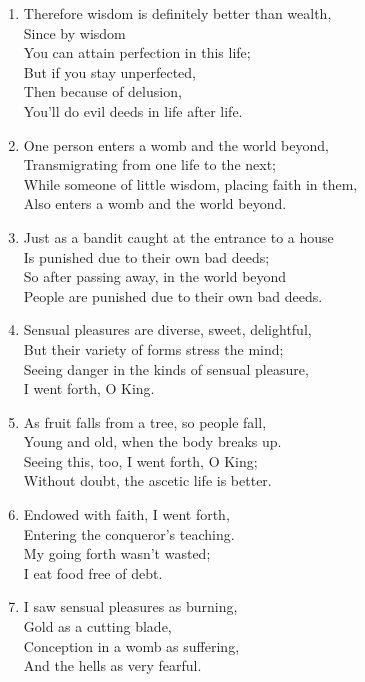 \documentclass[10pt, openany]{book}
\begin{document}
\begin{enumerate}
\item Therefore wisdom is definitely better than wealth,\\
Since by wisdom \\
You can attain perfection in this life;\\
But if you stay unperfected, \\
Then because of delusion,\\
You’ll do evil deeds in life after life.

\item One person enters a womb and the world beyond,\\
Transmigrating from one life to the next;\\
While someone of little wisdom, placing faith in them,\\
Also enters a womb and the world beyond.

\item Just as a bandit caught at the entrance to a house\\
Is punished due to their own bad deeds;\\
So after passing away, in the world beyond\\
People are punished due to their own bad deeds.

\item Sensual pleasures are diverse, sweet, delightful,\\
But their variety of forms stress the mind;\\
Seeing danger in the kinds of sensual pleasure,\\
I went forth, O King.

\item As fruit falls from a tree, so people fall,\\
Young and old, when the body breaks up.\\
Seeing this, too, I went forth, O King;\\
Without doubt, the ascetic life is better.

\item Endowed with faith, I went forth,\\
Entering the conqueror’s teaching.\\
My going forth wasn’t wasted;\\
I eat food free of debt.

\item I saw sensual pleasures as burning,\\
Gold as a cutting blade,\\
Conception in a womb as suffering,\\
And the hells as very fearful.


\end{enumerate}
\end{document}
